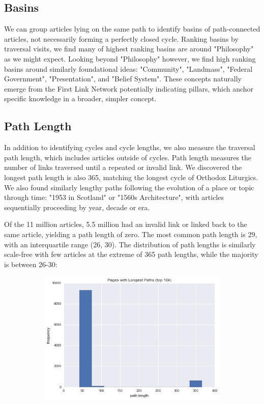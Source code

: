 \documentclass[twoside]{article}
\begin{document}
\subsection{Basins}
We can group articles lying on the same path to identify basins of path-connected articles, not necessarily forming a perfectly closed cycle.
Ranking basins by traversal visits, we find many of highest ranking basins are around "Philosophy" as we might expect. 
Looking beyond "Philosophy" however, we find high ranking basins around similarly foundational ideas:
"Community", "Landmass", "Federal Government", "Presentation", and "Belief System". 
These concepts naturally emerge from the First Link Network potentially indicating pillars, which 
anchor specific knowledge in a broader, simpler concept.


\subsection{Path Length}

In addition to identifying cycles and cycle lengths, we also measure the traversal path length, which includes articles outside
of cycles. 
Path length measures the number of links traversed until a repeated or invalid link. 
We discovered the longest path length is also 365, matching the longest cycle of Orthodox Liturgics. 
We also found similarly lengthy paths following the evolution of a place or topic through time: 
"1953 in Scotland" or "1560s Architecture", with articles sequentially proceeding by year, decade or era.

Of the 11 million articles, 5.5 million had an invalid link or linked back to the same article, yielding a path length of zero. 
The most common path length is 29, with an interquartile range (26, 30).
The distribution of path lengths is similarly scale-free with few articles at the extreme of 365 path lengths, while the majority 
is between 26-30: 

\begin{figure}[H]
\centering
    \caption{Longest Path Lengths}
    \begin{subfigure}[b]{0.5\textwidth}
        \includegraphics[width=\textwidth]{graphics/top_1k_path_length.png}
    \end{subfigure}
\end{figure}
\end{document}
